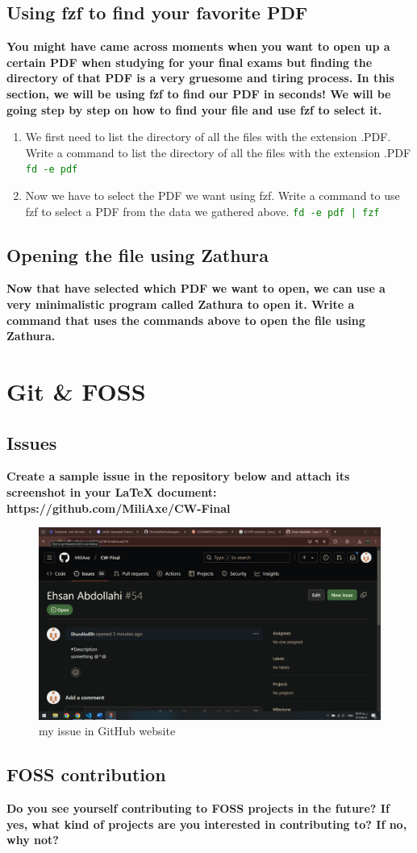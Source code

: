 \documentclass{article}
\begin{document}
    \subsection{Using fzf to find your favorite PDF}
    \textbf{You might have came across moments when you want to open up a certain PDF when studying for your final exams but finding the directory of that PDF is a very gruesome and tiring process. In this section, we will be using fzf to find our PDF in seconds! We will be going step by step on how to find your file and use fzf to select it.}
    \begin{enumerate}
        \item We first need to list the directory of all the files with the extension .PDF. Write a command to list the directory of all the files with the extension .PDF
        \textcolor{green}{\texttt{fd -e pdf}}
        \item Now we have to select the PDF we want using fzf. Write a command to use fzf to select a PDF from the data we gathered above.
        \textcolor{green}{\texttt{fd -e pdf | fzf}}
    \end{enumerate}
    
    \subsection{Opening the file using Zathura}
    \textbf{Now that have selected which PDF we want to open, we can use a very minimalistic program called Zathura to open it. Write a command that uses the commands above to open the file using Zathura.}

    \section{Git \& FOSS}
    \subsection{Issues}
    \textbf{Create a sample issue in the repository below and attach its screenshot in your LaTeX document: https://github.com/MiliAxe/CW-Final}
    \begin{figure}[h]
        \centering
        \includegraphics[width=1\textwidth]{Screenshot.png}
        \caption{my issue in GitHub website}
        \label{fig:my_image}
    \end{figure}
    \subsection{FOSS contribution}
    \textbf{Do you see yourself contributing to FOSS projects in the future? If yes, what kind of projects are you interested in contributing to? If no, why not?}
\end{document}
